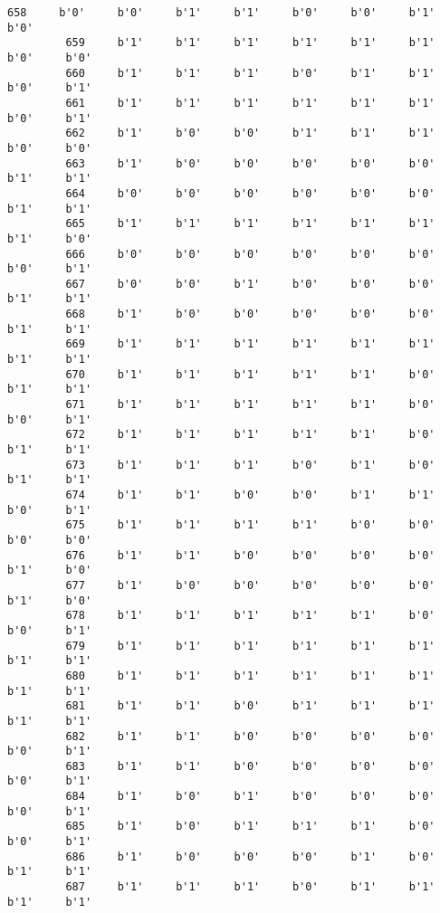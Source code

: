 \documentclass[11pt]{article}
\begin{document}
\begin{Verbatim}[commandchars=\\\{\}]
         658     b'0'     b'0'     b'1'     b'1'     b'0'     b'0'     b'1'     b'0'   
         659     b'1'     b'1'     b'1'     b'1'     b'1'     b'1'     b'0'     b'0'   
         660     b'1'     b'1'     b'1'     b'0'     b'1'     b'1'     b'0'     b'1'   
         661     b'1'     b'1'     b'1'     b'1'     b'1'     b'1'     b'0'     b'1'   
         662     b'1'     b'0'     b'0'     b'1'     b'1'     b'1'     b'0'     b'0'   
         663     b'1'     b'0'     b'0'     b'0'     b'0'     b'0'     b'1'     b'1'   
         664     b'0'     b'0'     b'0'     b'0'     b'0'     b'0'     b'1'     b'1'   
         665     b'1'     b'1'     b'1'     b'1'     b'1'     b'1'     b'1'     b'0'   
         666     b'0'     b'0'     b'0'     b'0'     b'0'     b'0'     b'0'     b'1'   
         667     b'0'     b'0'     b'1'     b'0'     b'0'     b'0'     b'1'     b'1'   
         668     b'1'     b'0'     b'0'     b'0'     b'0'     b'0'     b'1'     b'1'   
         669     b'1'     b'1'     b'1'     b'1'     b'1'     b'1'     b'1'     b'1'   
         670     b'1'     b'1'     b'1'     b'1'     b'1'     b'0'     b'1'     b'1'   
         671     b'1'     b'1'     b'1'     b'1'     b'1'     b'0'     b'0'     b'1'   
         672     b'1'     b'1'     b'1'     b'1'     b'1'     b'0'     b'1'     b'1'   
         673     b'1'     b'1'     b'1'     b'0'     b'1'     b'0'     b'1'     b'1'   
         674     b'1'     b'1'     b'0'     b'0'     b'1'     b'1'     b'0'     b'1'   
         675     b'1'     b'1'     b'1'     b'1'     b'0'     b'0'     b'0'     b'0'   
         676     b'1'     b'1'     b'0'     b'0'     b'0'     b'0'     b'1'     b'0'   
         677     b'1'     b'0'     b'0'     b'0'     b'0'     b'0'     b'1'     b'0'   
         678     b'1'     b'1'     b'1'     b'1'     b'1'     b'0'     b'0'     b'1'   
         679     b'1'     b'1'     b'1'     b'1'     b'1'     b'1'     b'1'     b'1'   
         680     b'1'     b'1'     b'1'     b'1'     b'1'     b'1'     b'1'     b'1'   
         681     b'1'     b'1'     b'0'     b'1'     b'1'     b'1'     b'1'     b'1'   
         682     b'1'     b'1'     b'0'     b'0'     b'0'     b'0'     b'0'     b'1'   
         683     b'1'     b'1'     b'0'     b'0'     b'0'     b'0'     b'0'     b'1'   
         684     b'1'     b'0'     b'1'     b'0'     b'0'     b'0'     b'0'     b'1'   
         685     b'1'     b'0'     b'1'     b'1'     b'1'     b'0'     b'0'     b'1'   
         686     b'1'     b'0'     b'0'     b'0'     b'1'     b'0'     b'1'     b'1'   
         687     b'1'     b'1'     b'1'     b'0'     b'1'     b'1'     b'1'     b'1'   

\end{Verbatim}
\end{document}
